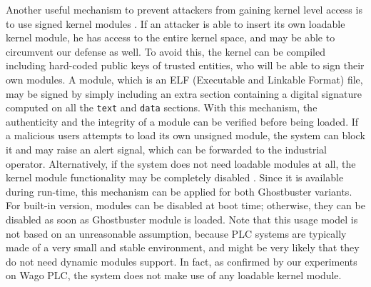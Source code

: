 Another useful mechanism to prevent attackers from gaining kernel level access is to use signed kernel modules \cite{signed-modules}.
If an attacker is able to insert its own loadable kernel module, he has access to the entire kernel space, and may be able to circumvent our defense as well.
To avoid this, the kernel can be compiled including hard-coded public keys of trusted entities, who will be able to sign their own modules.
A module, which is an ELF (Executable and Linkable Format) file, may be signed by simply including an extra section containing a digital signature
computed on all the \verb|text| and \verb|data| sections. With this mechanism, the authenticity and the integrity of a module can be verified before being loaded.
If a malicious users attempts to load its own unsigned module, the system can block it and may raise an alert signal,
which can be forwarded to the industrial operator. Alternatively, if the system does not need loadable modules at all,
the kernel module functionality may be completely disabled \cite{disable-modules}. Since it is available during run-time, this mechanism can be applied
for both Ghostbuster variants. For built-in version, modules can be disabled at boot time; otherwise, they can be disabled as soon as Ghostbuster module is loaded.
Note that this usage model is not based on an unreasonable assumption, because PLC systems are typically made of a very small and stable environment,
and might be very likely that they do not need dynamic modules support.
In fact, as confirmed by our experiments on Wago PLC, the system does not make use of any loadable kernel module.
